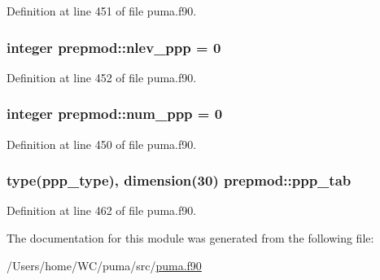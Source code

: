 \-Definition at line 451 of file puma.\-f90.

\hypertarget{classprepmod_ab4424b6e9966133154f2c7521b4f20c7}{
\subsubsection[{nlev\-\_\-ppp}]{\setlength{\rightskip}{0pt plus 5cm}integer {\bf prepmod\-::nlev\-\_\-ppp} = 0}}
\label{classprepmod_ab4424b6e9966133154f2c7521b4f20c7}


\-Definition at line 452 of file puma.\-f90.

\hypertarget{classprepmod_af7c26e3eb6ac74ce7f869f994f3f9096}{
\subsubsection[{num\-\_\-ppp}]{\setlength{\rightskip}{0pt plus 5cm}integer {\bf prepmod\-::num\-\_\-ppp} = 0}}
\label{classprepmod_af7c26e3eb6ac74ce7f869f994f3f9096}


\-Definition at line 450 of file puma.\-f90.

\hypertarget{classprepmod_afa7847e6f1a2a1e05e5318e9ec47ad51}{
\subsubsection[{ppp\-\_\-tab}]{\setlength{\rightskip}{0pt plus 5cm}type({\bf ppp\-\_\-type}), dimension(30) {\bf prepmod\-::ppp\-\_\-tab}}}
\label{classprepmod_afa7847e6f1a2a1e05e5318e9ec47ad51}


\-Definition at line 462 of file puma.\-f90.



\-The documentation for this module was generated from the following file\-:\begin{DoxyCompactItemize}
\item 
/\-Users/home/\-W\-C/puma/src/\hyperlink{puma_8f90}{puma.\-f90}\end{DoxyCompactItemize}
